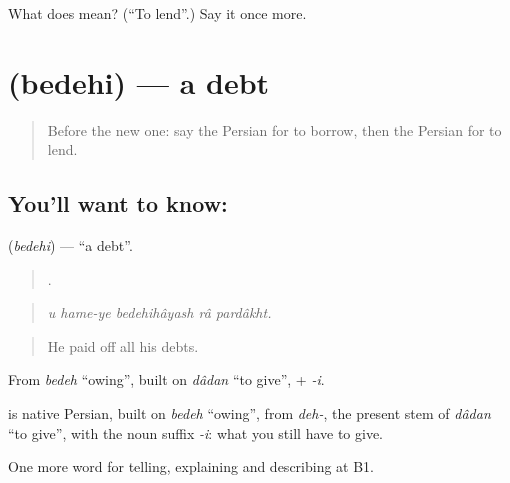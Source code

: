 \begin{tcolorbox}[breakable,colback=teal!4,colframe=teal!35!black,title={Before you move on}]
What does   mean? (\textquotedblleft{}To lend\textquotedblright{}.) Say it once more.
\end{tcolorbox}
\section[\texorpdfstring{\fa{بدهی} (bedehi)}{بدهی (bedehi)}]{ (bedehi) — a debt}

\label{lesson:FA-C411-bedehi}



\begin{quote}
Before the new one: say the Persian for to borrow, then the Persian for to lend.
\end{quote}

\subsection*{You'll want to know: }
\textbf{} (\emph{bedehi}) — \textquotedblleft{}a debt\textquotedblright{}.

\begin{quote}
    .
\end{quote}

\begin{quote}
\emph{u hame-ye bedehihâyash râ pardâkht.}
\end{quote}

\begin{quote}
He paid off all his debts.
\end{quote}

From \emph{bedeh} \textquotedblleft{}owing\textquotedblright{}, built on \emph{dâdan} \textquotedblleft{}to give\textquotedblright{}, + \emph{-i}.

\begin{cousinweb}
\textbf{} is native Persian, built on \emph{bedeh} \textquotedblleft{}owing\textquotedblright{}, from \emph{deh-}, the present stem of \emph{dâdan} \textquotedblleft{}to give\textquotedblright{}, with the noun suffix \emph{-i}: what you still have to give.
\end{cousinweb}

\begin{grammarlens}[title={What you've built}]
One more word for telling, explaining and describing at B1.
\end{grammarlens}

